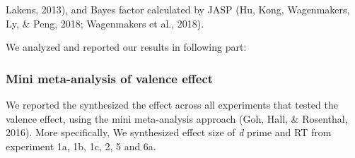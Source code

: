 \documentclass[
  man]{apa6}
\begin{document}
Lakens, 2013), and Bayes factor calculated by JASP (Hu, Kong, Wagenmakers, Ly, \& Peng, 2018; Wagenmakers et al., 2018).

We analyzed and reported our results in following part:

\hypertarget{mini-meta-analysis-of-valence-effect}{%
\subsubsection{Mini meta-analysis of valence effect}\label{mini-meta-analysis-of-valence-effect}}

We reported the synthesized the effect across all experiments that tested the valence effect, using the mini meta-analysis approach (Goh, Hall, \& Rosenthal, 2016). More specifically, We synthesized effect size of \emph{d} prime and RT from experiment 1a, 1b, 1c, 2, 5 and 6a.
\end{document}
